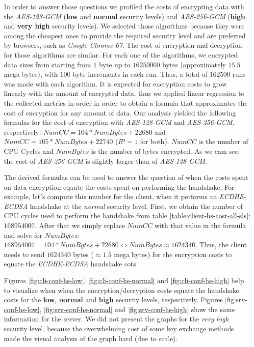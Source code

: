 \documentclass{llncs}
\begin{document}
In order to answer those questions we profiled the costs of encrypting data with the \textit{AES-128-GCM} (\textbf{low} and 
\textbf{normal} security levels) and \textit{AES-256-GCM} (\textbf{high} and \textbf{very high} security levels). 
We selected those algorithms because they were among the cheapest ones to provide the required security level and are preferred by
browsers, such as \textit{Google Chrome 67}. The cost of encryption and decryption for those algorithms are similar\cite{ertaul2016performance}.
For each
one of the algorithms, we encrypted data sizes from starting from $1$ byte up to $16250000$ bytes (approximately $15.5$ mega bytes),
with $100$ byte increments in each run. Thus, a total of $162500$ runs was made with each algorithm. It is expected for encryption costs to
grow linearly with the amount of encrypted data, thus we applied linear regression to the collected metrics in order in order to
obtain a formula that approximates the cost of encryption for any amount of data. Our analysis yielded the following formulas for the
cost of encryption with \textit{AES-128-GCM} and \textit{AES-256-GCM}, respectively: $NumCC=104*NumBytes+22680$ and $NumCC=105*NumBytes+22740$ ($R²=1$ for both).
$NumCC$ is the number of CPU Cycles and $NumBytes$ is the number of bytes encrypted. As we cam see. the cost of \textit{AES-256-GCM} is slightly
larger than of \textit{AES-128-GCM}.

The derived formulas can be used to answer the question of when the costs spent on data encryption equate the costs
spent on performing the handshake. For example, let's compute this number for the client, when it performs an
\textit{ECDHE-ECDSA} handshake at the \textit{normal} security level. First, we obtain the number of CPU cycles
used to perform the handshake from table \ref{table:client-hs-cost-all-sls}: $168954007$. After that we simply
replace $NumCC$ with that value in the formula and solve for $NumBytes$: $168954007=104*NumBytes+22680 \Leftrightarrow NumBytes \approx 1624340$.
Thus, the client needs to send $1624340$ bytes ($\approx 1.5$ mega bytes) for the encryption costs to equate the \textit{ECDHE-ECDSA} handshake cots.

Figures \ref{fig:cli-conf-hs-low}, \ref{fig:cli-conf-hs-normal} and \ref{fig:cli-conf-hs-high} help to visualize when
when the encryption/decryption costs equate the handshake costs for the \textbf{low}, \textbf{normal} and \textbf{high}
security levels, respectively. Figures \ref{fig:srv-conf-hs-low}, \ref{fig:srv-conf-hs-normal} and \ref{fig:srv-conf-hs-high}
show the same information for the server. We did not present the graphs for the \textit{very high} security level,
because the overwhelming cost of some key exchange methods made the visual analysis of the graph hard (due to scale).
\end{document}
